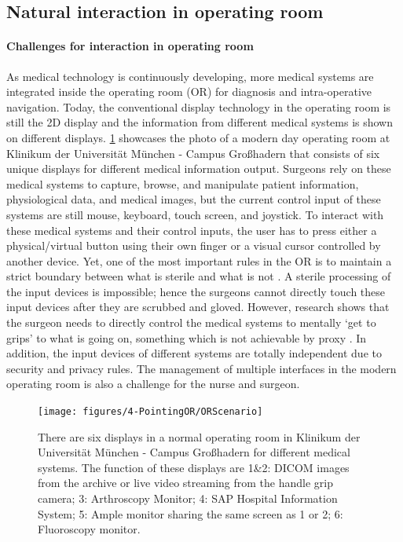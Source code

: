 \subsection{Natural interaction in operating room}
\paragraph{Challenges for interaction in operating room}
As medical technology is continuously developing, more medical systems are integrated inside the operating room (OR) for diagnosis and intra-operative navigation. Today, the conventional display technology in the operating room is still the 2D display and the information from different medical systems is shown on different displays.
\figurename{\ref{fig:1-intro:ORScenario}} showcases the photo of a modern day operating room at Klinikum der Universit\"at M\"unchen - Campus Gro{\ss}hadern that consists of six unique displays for different medical information output. 
Surgeons rely on these medical systems to capture, browse, and manipulate patient information, physiological data, and medical images, but the current control input of these systems are still mouse, keyboard, touch screen, and joystick. To interact with these medical systems and their control inputs, the user has to press either a physical/virtual button using their own finger or a visual cursor controlled by another device. 
Yet, one of the most important rules in the OR is to maintain a strict boundary between what is sterile and what is not \cite{OHara2014a}. A sterile processing of the input devices is impossible; hence the surgeons cannot directly touch these input devices after they are scrubbed and gloved. However, research shows that the surgeon {needs} to directly control the medical systems to mentally `get to grips' to what is going on, something which is not achievable by proxy \cite{Johnson2011a}. In addition, the input devices of different systems are totally independent due to security and privacy rules. The management of multiple interfaces in the modern operating room is also a challenge for the nurse and surgeon.
\begin{figure} [htb]
	\centering
	\texttt{[image: figures/4-PointingOR/ORScenario]}
	\caption{There are six displays in a normal operating room in Klinikum der Universit\"at M\"unchen - Campus Gro{\ss}hadern for different medical systems. The function of these displays are 1\&2: DICOM images from the archive or live video streaming from the handle grip camera; 3: Arthroscopy Monitor; 4: SAP Hospital Information System; 5: Ample monitor sharing the same screen as 1 or 2; 6: Fluoroscopy monitor.}
	\label{fig:1-intro:ORScenario}       %
\end{figure}
